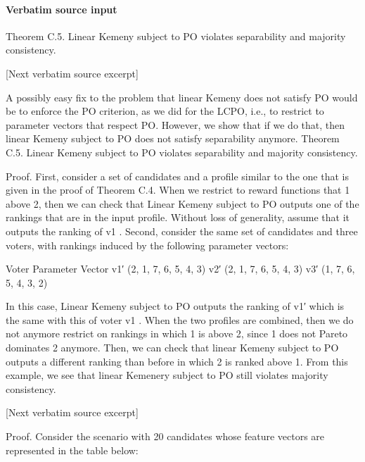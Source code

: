 \documentclass[10pt]{article}
\begin{document}
\paragraph{Verbatim source input}
\begin{ReviewVerbatim}
Theorem C.5. Linear Kemeny subject to PO violates separability and majority consistency.

[Next verbatim source excerpt]

A possibly easy fix to the problem that linear Kemeny does not satisfy PO would be to enforce the
PO criterion, as we did for the LCPO, i.e., to restrict to parameter vectors that respect PO. However,
we show that if we do that, then linear Kemeny subject to PO does not satisfy separability anymore.
Theorem C.5. Linear Kemeny subject to PO violates separability and majority consistency.

Proof. First, consider a set of candidates and a profile similar to the one that is given in the proof
of Theorem C.4. When we restrict to reward functions that 1 above 2, then we can check that Linear
Kemeny subject to PO outputs one of the rankings that are in the input profile. Without loss of
generality, assume that it outputs the ranking of v1 .
Second, consider the same set of candidates and three voters, with rankings induced by the following
parameter vectors:

                                      Voter    Parameter Vector
                                        v1′    (2, 1, 7, 6, 5, 4, 3)
                                        v2′    (2, 1, 7, 6, 5, 4, 3)
                                        v3′    (1, 7, 6, 5, 4, 3, 2)

In this case, Linear Kemeny subject to PO outputs the ranking of v1′ which is the same with this of
voter v1 .
When the two profiles are combined, then we do not anymore restrict on rankings in which 1 is above
2, since 1 does not Pareto dominates 2 anymore. Then, we can check that linear Kemeny subject to
PO outputs a different ranking than before in which 2 is ranked above 1. From this example, we see
that linear Kemenery subject to PO still violates majority consistency.

[Next verbatim source excerpt]

Proof. Consider the scenario with 20 candidates whose feature vectors are represented in the table
below:


\end{ReviewVerbatim}
\end{document}
